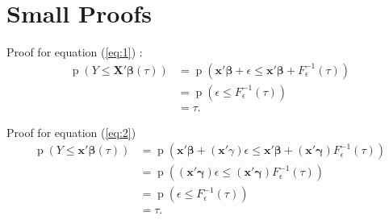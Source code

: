 \documentclass[12pt]{article}
\DeclareMathOperator{\pr}{p}
\begin{document}

% 


\appendix 
\section{Small Proofs}

Proof for equation (\ref{eq:1}) : 
\begin{align*}
  \pr (Y \le \bm{X'\beta}(\tau)) & = \pr \left( \bm{x'\beta} + \epsilon
    \le \bm{x'\beta} + F^{-1}_{\epsilon}(\tau) \right) \\
  & = \pr (\epsilon \le F^{-1}_{\epsilon}(\tau)) \\
  & = \tau. 
\end{align*}

Proof for equation (\ref{eq:2})
\begin{align*}
  \pr (Y \le \bm{x'\beta}(\tau)) & = \pr \left( \bm{x'\beta} +
    (\bm{x}'\gamma) \epsilon \le \bm{x'\beta} + (\bm{x'\gamma})
    F^{-1}_{\epsilon}(\tau) \right) \\
  & = \pr \left( (\bm{x'\gamma}) \epsilon \le  (\bm{x'\gamma})
    F^{-1}_{\epsilon}(\tau)  \right)\\
  & = \pr (\epsilon \le F^{-1}_{\epsilon}(\tau)) \\
  & = \tau .
\end{align*}
\end{document}
